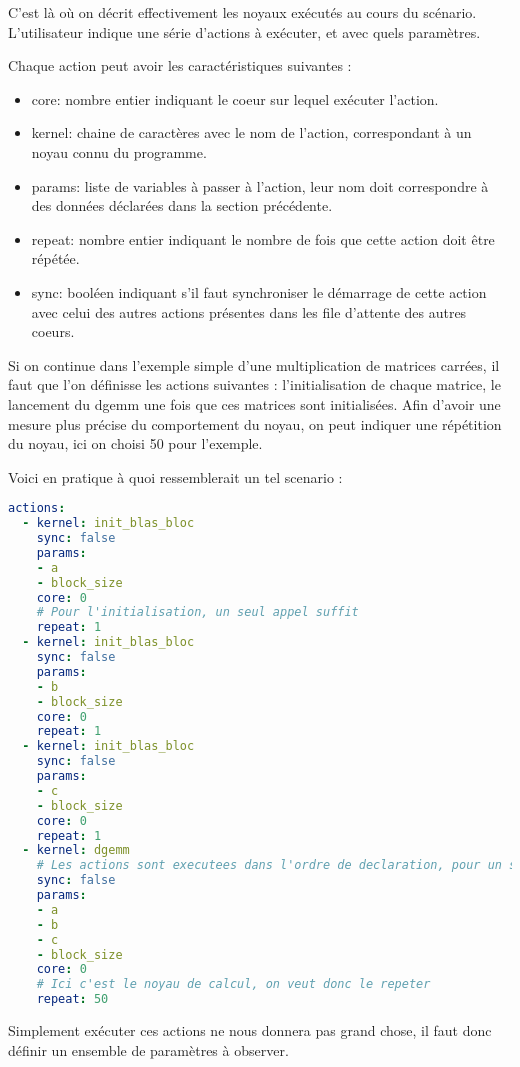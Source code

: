 C'est là où on décrit effectivement les noyaux exécutés au cours du scénario.
L'utilisateur indique une série d'actions à exécuter, et avec quels paramètres.

Chaque action peut avoir les caractéristiques suivantes :
\begin{itemize}
  \item core: nombre entier indiquant le coeur sur lequel exécuter l'action.
  \item kernel: chaine de caractères avec le nom de l'action, correspondant à un noyau connu du programme.
  \item params: liste de variables à passer à l'action, leur nom doit correspondre à des données déclarées dans la section précédente.
  \item repeat: nombre entier indiquant le nombre de fois que cette action doit être répétée.
  \item sync: booléen indiquant s'il faut synchroniser le démarrage de cette action avec celui des autres actions présentes dans les file d'attente des autres coeurs.
\end{itemize}

Si on continue dans l'exemple simple d'une multiplication de matrices carrées, il faut que l'on définisse les actions suivantes : l'initialisation de chaque matrice, le lancement du dgemm une fois que ces matrices sont initialisées.
Afin d'avoir une mesure plus précise du comportement du noyau, on peut indiquer une répétition du noyau, ici on choisi 50 pour l'exemple.

Voici en pratique à quoi ressemblerait un tel scenario :
\begin{lstlisting}[language=yaml,caption=Exemple de déclaration d'actions,label=lst:tool:actions-example]
actions:
  - kernel: init_blas_bloc
    sync: false
    params: 
    - a
    - block_size
    core: 0
    # Pour l'initialisation, un seul appel suffit
    repeat: 1
  - kernel: init_blas_bloc
    sync: false
    params: 
    - b
    - block_size
    core: 0
    repeat: 1
  - kernel: init_blas_bloc
    sync: false
    params: 
    - c
    - block_size
    core: 0
    repeat: 1
  - kernel: dgemm
    # Les actions sont executees dans l'ordre de declaration, pour un seul dgemm c'est inutile de synchroniser
    sync: false
    params: 
    - a
    - b
    - c
    - block_size
    core: 0
    # Ici c'est le noyau de calcul, on veut donc le repeter
    repeat: 50
\end{lstlisting}

Simplement exécuter ces actions ne nous donnera pas grand chose, il faut donc définir un ensemble de paramètres à observer.

